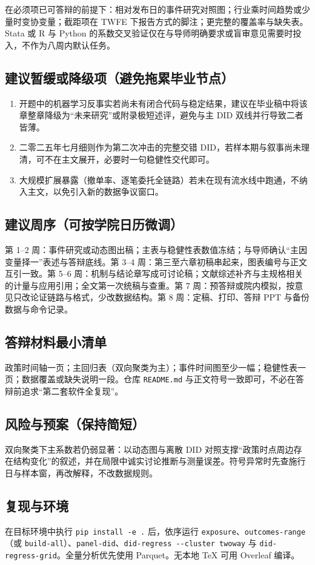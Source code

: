 \documentclass[UTF8, a4paper, 12pt]{ctexart}
\newcommand{\id}[1]{{\footnotesize\nolinkurl{#1}}}
\begin{document}
在必须项已可答辩的前提下：相对发布日的事件研究对照图；行业乘时间趋势或少量时变协变量；截距项在 TWFE 下报告方式的脚注；更完整的覆盖率与缺失表。Stata 或 R 与 Python 的系数交叉验证仅在与导师明确要求或盲审意见需要时投入，不作为八周内默认任务。

\subsection{建议暂缓或降级项（避免拖累毕业节点）}

\begin{enumerate}[leftmargin=2em]
  \item 开题中的机器学习反事实若尚未有闭合代码与稳定结果，建议在毕业稿中将该章整章降级为“未来研究”或附录极短述评，避免与主 DID 双线并行导致二者皆薄。
  \item 二零二五年七月细则作为第二次冲击的完整交错 DID，若样本期与叙事尚未理清，可不在主文展开，必要时一句稳健性交代即可。
  \item 大规模扩展暴露（撤单率、逐笔委托全链路）若未在现有流水线中跑通，不纳入主文，以免引入新的数据争议窗口。
\end{enumerate}

\subsection{建议周序（可按学院日历微调）}

第 1--2 周：事件研究或动态图出稿；主表与稳健性表数值冻结；与导师确认“主因变量择一”表述与答辩底线。第 3--4 周：第三至六章初稿串起来，图表编号与正文互引一致。第 5--6 周：机制与结论章写成可讨论稿；文献综述补齐与主规格相关的计量与应用引用；全文第一次统稿与查重。第 7 周：预答辩或院内模拟，按意见只改论证链路与格式，少改数据结构。第 8 周：定稿、打印、答辩 PPT 与备份数据与命令记录。

\subsection{答辩材料最小清单}

政策时间轴一页；主回归表（双向聚类为主）；事件时间图至少一幅；稳健性表一页；数据覆盖或缺失说明一段。仓库 \id{README.md} 与正文符号一致即可，不必在答辩前追求“第二套软件全复现”。

\subsection{风险与预案（保持简短）}

双向聚类下主系数若仍弱显著：以动态图与离散 DID 对照支撑“政策时点周边存在结构变化”的叙述，并在局限中诚实讨论推断与测量误差。符号异常时先查施行日与样本窗，再改解释，不改数据规则。

\subsection{复现与环境}

在目标环境中执行 \id{pip install -e .} 后，依序运行 \id{exposure}、\id{outcomes-range}（或 \id{build-all}）、\id{panel-did}、\id{did-regress --cluster twoway} 与 \id{did-regress-grid}。全量分析优先使用 Parquet。无本地 TeX 可用 Overleaf 编译。
\end{document}
